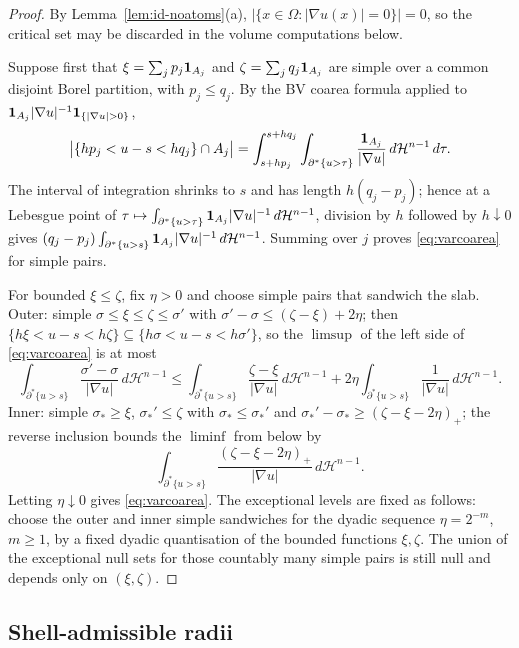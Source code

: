 \documentclass[11pt]{amsart}
\theoremstyle{definition}
\newcommand{\Om}{\Omega}
\newcommand{\Hn}{\mathcal H^{n-1}}
\begin{document}
\begin{proof}
By Lemma~\ref{lem:id-noatoms}(a), \(|\{x\in\Om:|\nabla u(x)|=0\}|=0\), so the
critical set may be discarded in the volume computations below.

Suppose first that \(\xi=\sum_j p_j{\bf1}_{A_j}\) and
\(\zeta=\sum_j q_j{\bf1}_{A_j}\) are simple over a common disjoint Borel
partition, with \(p_j\le q_j\).  By the BV coarea formula applied to
\({\bf1}_{A_j}|\nabla u|^{-1}{\bf1}_{\{|\nabla u|>0\}}\),
\[
   \bigl|\{hp_j<u-s<hq_j\}\cap A_j\bigr|
   =
   \int_{s+hp_j}^{s+hq_j}
      \int_{\partial^*\{u>\tau\}}\frac{{\bf1}_{A_j}}{|\nabla u|}
      \,d\Hn\,d\tau .
\]
The interval of integration shrinks to \(s\) and has length
\(h(q_j-p_j)\); hence at a Lebesgue point of
\(\tau\mapsto\int_{\partial^*\{u>\tau\}}{\bf1}_{A_j}|\nabla u|^{-1}\,d\Hn\),
division by \(h\) followed by \(h\downarrow0\) gives
\((q_j-p_j)\int_{\partial^*\{u>s\}}{\bf1}_{A_j}|\nabla u|^{-1}\,d\Hn\).
Summing over \(j\) proves \eqref{eq:varcoarea} for simple pairs.

For bounded \(\xi\le\zeta\), fix \(\eta>0\) and choose simple pairs that
sandwich the slab.  Outer: simple \(\sigma\le\xi\le\zeta\le\sigma'\) with
\(\sigma'-\sigma\le(\zeta-\xi)+2\eta\); then
\(\{h\xi<u-s<h\zeta\}\subseteq\{h\sigma<u-s<h\sigma'\}\), so the
\(\limsup\) of the left side of \eqref{eq:varcoarea} is at most
\[
   \int_{\partial^*\{u>s\}}\frac{\sigma'-\sigma}{|\nabla u|}\,d\Hn
   \le
   \int_{\partial^*\{u>s\}}\frac{\zeta-\xi}{|\nabla u|}\,d\Hn
   +2\eta\int_{\partial^*\{u>s\}}\frac1{|\nabla u|}\,d\Hn .
\]
Inner: simple \(\sigma_*\ge\xi\),
\(\sigma_*'\le\zeta\) with \(\sigma_*\le\sigma_*'\) and
\(\sigma_*'-\sigma_*\ge(\zeta-\xi-2\eta)_+\); the reverse inclusion bounds
the \(\liminf\) from below by
\[
   \int_{\partial^*\{u>s\}}
      \frac{(\zeta-\xi-2\eta)_+}{|\nabla u|}\,d\Hn .
\]
Letting \(\eta\downarrow0\) gives \eqref{eq:varcoarea}.  The exceptional
levels are fixed as follows: choose the outer and inner simple sandwiches for
the dyadic sequence \(\eta=2^{-m}\), \(m\ge1\), by a fixed dyadic
quantisation of the bounded functions \(\xi,\zeta\).  The union of the
exceptional null sets for those countably many simple pairs is still null and
depends only on \((\xi,\zeta)\).
\end{proof}

\subsection*{Shell-admissible radii}
\end{document}
